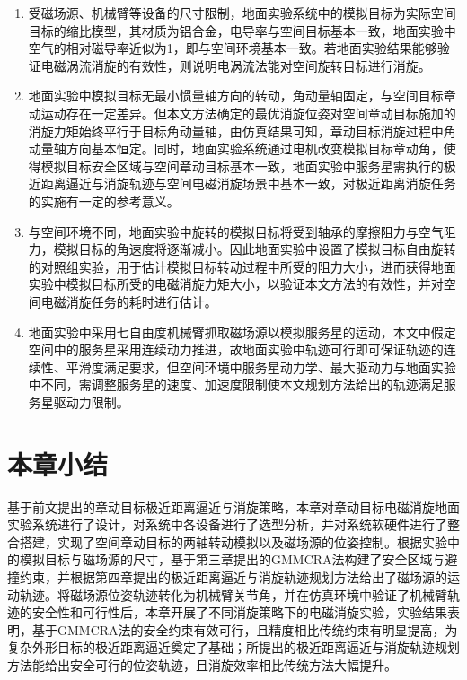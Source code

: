 \documentclass[lang=chs, degree=master, blindreview=false, winfonts=true]{yanputhesis}
\begin{document}
\begin{enumerate}
	
	\item 受磁场源、机械臂等设备的尺寸限制，地面实验系统中的模拟目标为实际空间目标的缩比模型，其材质为铝合金，电导率与空间目标基本一致，地面实验中空气的相对磁导率近似为1，即与空间环境基本一致。若地面实验结果能够验证电磁涡流消旋的有效性，则说明电涡流法能对空间旋转目标进行消旋。
	
	\item 地面实验中模拟目标无最小惯量轴方向的转动，角动量轴固定，与空间目标章动运动存在一定差异。但本文方法确定的最优消旋位姿对空间章动目标施加的消旋力矩始终平行于目标角动量轴，由仿真结果可知，章动目标消旋过程中角动量轴方向基本恒定。同时，地面实验系统通过电机改变模拟目标章动角，使得模拟目标安全区域与空间章动目标基本一致，地面实验中服务星需执行的极近距离逼近与消旋轨迹与空间电磁消旋场景中基本一致，对极近距离消旋任务的实施有一定的参考意义。
	
	\item 与空间环境不同，地面实验中旋转的模拟目标将受到轴承的摩擦阻力与空气阻力，模拟目标的角速度将逐渐减小。因此地面实验中设置了模拟目标自由旋转的对照组实验，用于估计模拟目标转动过程中所受的阻力大小，进而获得地面实验中模拟目标所受的电磁消旋力矩大小，以验证本文方法的有效性，并对空间电磁消旋任务的耗时进行估计。
	
	\item 地面实验中采用七自由度机械臂抓取磁场源以模拟服务星的运动，本文中假定空间中的服务星采用连续动力推进，故地面实验中轨迹可行即可保证轨迹的连续性、平滑度满足要求，但空间环境中服务星动力学、最大驱动力与地面实验中不同，需调整服务星的速度、加速度限制使本文规划方法给出的轨迹满足服务星驱动力限制。

\end{enumerate}


\section{本章小结}
基于前文提出的章动目标极近距离逼近与消旋策略，本章对章动目标电磁消旋地面实验系统进行了设计，对系统中各设备进行了选型分析，并对系统软硬件进行了整合搭建，实现了空间章动目标的两轴转动模拟以及磁场源的位姿控制。根据实验中的模拟目标与磁场源的尺寸，基于第三章提出的GMMCRA法构建了安全区域与避撞约束，并根据第四章提出的极近距离逼近与消旋轨迹规划方法给出了磁场源的运动轨迹。将磁场源位姿轨迹转化为机械臂关节角，并在仿真环境中验证了机械臂轨迹的安全性和可行性后，本章开展了不同消旋策略下的电磁消旋实验，实验结果表明，基于GMMCRA法的安全约束有效可行，且精度相比传统约束有明显提高，为复杂外形目标的极近距离逼近奠定了基础；所提出的极近距离逼近与消旋轨迹规划方法能给出安全可行的位姿轨迹，且消旋效率相比传统方法大幅提升。
\end{document}
